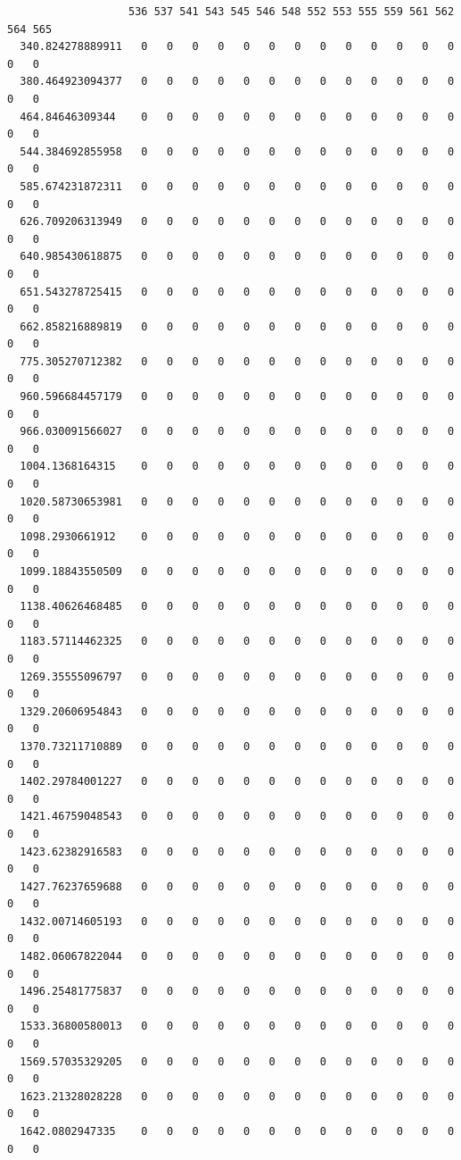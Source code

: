 \documentclass[
  letterpaper,
  DIV=11,
  numbers=noendperiod]{scrartcl}
\begin{document}
\begin{verbatim}
                   536 537 541 543 545 546 548 552 553 555 559 561 562 564 565
  340.824278889911   0   0   0   0   0   0   0   0   0   0   0   0   0   0   0
  380.464923094377   0   0   0   0   0   0   0   0   0   0   0   0   0   0   0
  464.84646309344    0   0   0   0   0   0   0   0   0   0   0   0   0   0   0
  544.384692855958   0   0   0   0   0   0   0   0   0   0   0   0   0   0   0
  585.674231872311   0   0   0   0   0   0   0   0   0   0   0   0   0   0   0
  626.709206313949   0   0   0   0   0   0   0   0   0   0   0   0   0   0   0
  640.985430618875   0   0   0   0   0   0   0   0   0   0   0   0   0   0   0
  651.543278725415   0   0   0   0   0   0   0   0   0   0   0   0   0   0   0
  662.858216889819   0   0   0   0   0   0   0   0   0   0   0   0   0   0   0
  775.305270712382   0   0   0   0   0   0   0   0   0   0   0   0   0   0   0
  960.596684457179   0   0   0   0   0   0   0   0   0   0   0   0   0   0   0
  966.030091566027   0   0   0   0   0   0   0   0   0   0   0   0   0   0   0
  1004.1368164315    0   0   0   0   0   0   0   0   0   0   0   0   0   0   0
  1020.58730653981   0   0   0   0   0   0   0   0   0   0   0   0   0   0   0
  1098.2930661912    0   0   0   0   0   0   0   0   0   0   0   0   0   0   0
  1099.18843550509   0   0   0   0   0   0   0   0   0   0   0   0   0   0   0
  1138.40626468485   0   0   0   0   0   0   0   0   0   0   0   0   0   0   0
  1183.57114462325   0   0   0   0   0   0   0   0   0   0   0   0   0   0   0
  1269.35555096797   0   0   0   0   0   0   0   0   0   0   0   0   0   0   0
  1329.20606954843   0   0   0   0   0   0   0   0   0   0   0   0   0   0   0
  1370.73211710889   0   0   0   0   0   0   0   0   0   0   0   0   0   0   0
  1402.29784001227   0   0   0   0   0   0   0   0   0   0   0   0   0   0   0
  1421.46759048543   0   0   0   0   0   0   0   0   0   0   0   0   0   0   0
  1423.62382916583   0   0   0   0   0   0   0   0   0   0   0   0   0   0   0
  1427.76237659688   0   0   0   0   0   0   0   0   0   0   0   0   0   0   0
  1432.00714605193   0   0   0   0   0   0   0   0   0   0   0   0   0   0   0
  1482.06067822044   0   0   0   0   0   0   0   0   0   0   0   0   0   0   0
  1496.25481775837   0   0   0   0   0   0   0   0   0   0   0   0   0   0   0
  1533.36800580013   0   0   0   0   0   0   0   0   0   0   0   0   0   0   0
  1569.57035329205   0   0   0   0   0   0   0   0   0   0   0   0   0   0   0
  1623.21328028228   0   0   0   0   0   0   0   0   0   0   0   0   0   0   0
  1642.0802947335    0   0   0   0   0   0   0   0   0   0   0   0   0   0   0

\end{verbatim}
\end{document}
